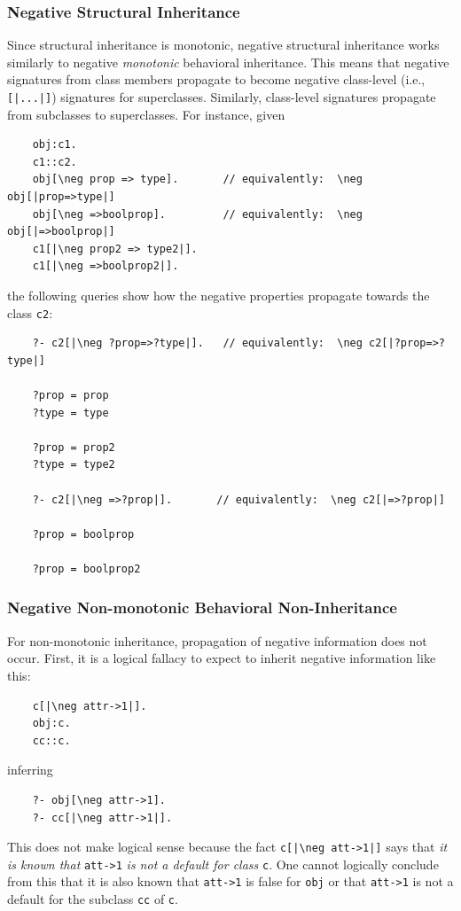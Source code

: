 \documentclass[11pt]{article}
\newcommand{\bs}{\textbackslash}
\newcommand{\RULELOGNEG}{{\texttt{{\bs}neg}}\xspace}
\begin{document}
\subsubsection{Negative Structural Inheritance}

Since structural inheritance is monotonic,
negative structural inheritance works similarly to negative \emph{monotonic}
behavioral inheritance. This means that negative signatures from class
members propagate to become negative class-level (i.e.,
\texttt{[|...|]}) signatures for superclasses. Similarly, class-level
signatures propagate from subclasses to superclasses. For instance, given
\begin{verbatim}
    obj:c1.
    c1::c2.
    obj[\neg prop => type].       // equivalently:  \neg obj[|prop=>type|]
    obj[\neg =>boolprop].         // equivalently:  \neg obj[|=>boolprop|]
    c1[|\neg prop2 => type2|].
    c1[|\neg =>boolprop2|].
\end{verbatim}
the following queries show how the negative properties propagate towards
the class \texttt{c2}:
\begin{verbatim}
    ?- c2[|\neg ?prop=>?type|].   // equivalently:  \neg c2[|?prop=>?type|]

    ?prop = prop
    ?type = type

    ?prop = prop2
    ?type = type2

    ?- c2[|\neg =>?prop|].       // equivalently:  \neg c2[|=>?prop|]

    ?prop = boolprop

    ?prop = boolprop2
\end{verbatim}

\subsubsection{Negative Non-monotonic Behavioral Non-Inheritance}

For non-monotonic inheritance, propagation of negative information does not
occur.
First, it is a logical fallacy to expect to inherit negative information like
this:
\begin{verbatim}
    c[|\neg attr->1|].
    obj:c.
    cc::c.
\end{verbatim}
inferring
\begin{verbatim}
    ?- obj[\neg attr->1].
    ?- cc[|\neg attr->1|].
\end{verbatim}
This does not make logical sense because the fact \texttt{c[|\RULELOGNEG att->1|]} says
that \emph{it is known that} \verb|att->1| \emph{is not a default for
  class} \texttt{c}. One cannot logically conclude from this that
it is also known that \verb|att->1| is false for \texttt{obj} or that 
\verb|att->1| is not a default for the subclass \texttt{cc} of \texttt{c}.  
\end{document}
